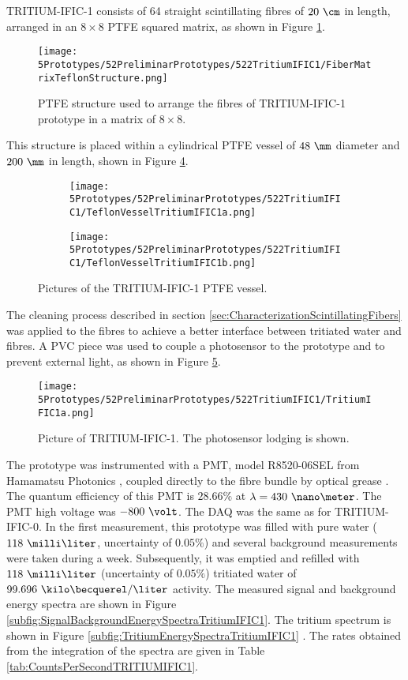 TRITIUM-IFIC-1 consists of 64 straight scintillating fibres of $20~\cm$ in length, arranged in an $8\times 8$ PTFE squared matrix, as shown in Figure \ref{fig:TeflonStructureFibersTritiumIFIC1}.
\begin{figure}[h]
\centering
\texttt{[image: 5Prototypes/52PreliminarPrototypes/522TritiumIFIC1/FiberMatrixTeflonStructure.png]}
\caption{PTFE structure used to arrange the fibres of TRITIUM-IFIC-1 prototype in a matrix of $8 \times 8$.\label{fig:TeflonStructureFibersTritiumIFIC1}}
\end{figure}
This structure is placed within a cylindrical PTFE vessel of $48~\mm$ diameter and $200~\mm$ in length, shown in Figure \ref{fig:TeflonVesselTritumIFIC1}. 
\begin{figure}
\centering
    \begin{subfigure}[b]{0.30\textwidth}
    \centering
    \texttt{[image: 5Prototypes/52PreliminarPrototypes/522TritiumIFIC1/TeflonVesselTritiumIFIC1a.png]}  
    \caption{\label{subfig:TeflonVesselTritumIFIC1a}}
    \end{subfigure}
    \hfill
    \begin{subfigure}[b]{0.45\textwidth}
    \centering
    \texttt{[image: 5Prototypes/52PreliminarPrototypes/522TritiumIFIC1/TeflonVesselTritiumIFIC1b.png]}  
    \caption{\label{subfig:TeflonVesselTritumIFIC1b}}
    \end{subfigure}
 \caption{Pictures of the TRITIUM-IFIC-1 PTFE vessel.}
 \label{fig:TeflonVesselTritumIFIC1}
\end{figure}
The cleaning process described in section \ref{sec:CharacterizationScintillatingFibers} was applied to the fibres to achieve a better interface between tritiated water and fibres. A PVC piece was used to couple a photosensor to the prototype and to prevent external light, as shown in Figure \ref{fig:TritumIFIC1}. 
\begin{figure}[h]
\centering
\texttt{[image: 5Prototypes/52PreliminarPrototypes/522TritiumIFIC1/TritiumIFIC1a.png]}
\caption{Picture of TRITIUM-IFIC-1. The photosensor lodging is shown.\label{fig:TritumIFIC1}}
\end{figure}
The prototype was instrumented with a PMT, model R8520-06SEL from Hamamatsu Photonics \cite{DataSheetPMTs}, coupled directly to the fibre bundle by optical grease \cite{OpticalGrease}. The quantum efficiency of this PMT is $28.66\%$ at $\lambda=430~\nano\meter$.  The PMT high voltage was $-800~\volt$. The DAQ was the same as for TRITIUM-IFIC-0. In the first measurement, this prototype was filled with pure water ($118~\milli\liter$, uncertainty of $0.05\%$) and several background measurements were taken during a week. Subsequently, it was emptied and refilled with $118~\milli\liter$ (uncertainty of $0.05\%$) tritiated water of $99.696~\kilo\becquerel/\liter$ activity. The measured signal and background energy spectra are shown in Figure \ref{subfig:SignalBackgroundEnergySpectraTritiumIFIC1}. The tritium spectrum is shown in Figure \ref{subfig:TritiumEnergySpectraTritiumIFIC1} \cite{SidneyNadia, SloveniaMarcos}. The rates obtained from the integration of the spectra are given in Table \ref{tab:CountsPerSecondTRITIUMIFIC1}. 


